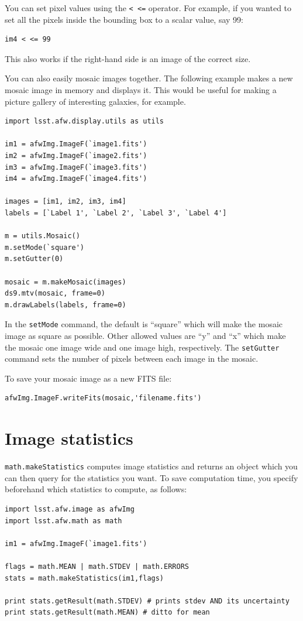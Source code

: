You can set pixel values using the \texttt{< <=} operator.  For
example, if you wanted to set all the pixels inside the bounding box to a
scalar value, say 99:

\begin{verbatim}
im4 < <= 99
\end{verbatim}

This also works if the right-hand side is an image of the correct size.

You can also easily mosaic images together.  The following example
makes a new mosaic image in memory and displays it.  This would be
useful for making a picture gallery of interesting galaxies, for
example.

\begin{verbatim}
import lsst.afw.display.utils as utils

im1 = afwImg.ImageF(`image1.fits')
im2 = afwImg.ImageF(`image2.fits')
im3 = afwImg.ImageF(`image3.fits')
im4 = afwImg.ImageF(`image4.fits')

images = [im1, im2, im3, im4]
labels = [`Label 1', `Label 2', `Label 3', `Label 4']

m = utils.Mosaic()
m.setMode(`square')
m.setGutter(0)

mosaic = m.makeMosaic(images)
ds9.mtv(mosaic, frame=0)
m.drawLabels(labels, frame=0)
\end{verbatim}

In the \texttt{setMode} command, the default is ``square'' which will
make the mosaic image as square as possible.  Other allowed values are
``y'' and ``x'' which make the mosaic one image wide and one image
high, respectively.  The \texttt{setGutter} command sets the number of
pixels between each image in the mosaic.

To save your mosaic image as a new FITS file:

\begin{verbatim}
afwImg.ImageF.writeFits(mosaic,'filename.fits')
\end{verbatim}


\section{Image statistics}

\texttt{math.makeStatistics} computes image statistics and returns an
object which you can then query for the statistics you want.  To save
computation time, you specify beforehand which statistics to compute,
as follows:

\begin{verbatim}
import lsst.afw.image as afwImg
import lsst.afw.math as math

im1 = afwImg.ImageF(`image1.fits')

flags = math.MEAN | math.STDEV | math.ERRORS 
stats = math.makeStatistics(im1,flags)

print stats.getResult(math.STDEV) # prints stdev AND its uncertainty
print stats.getResult(math.MEAN) # ditto for mean

\end{verbatim}

